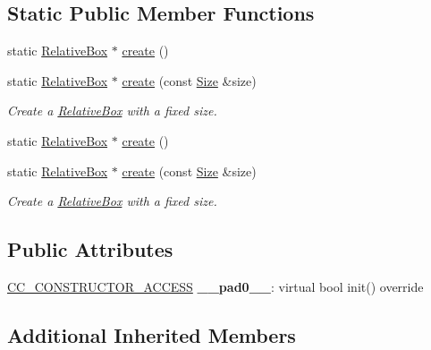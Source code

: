 \subsection*{Static Public Member Functions}
\begin{DoxyCompactItemize}
\item 
static \hyperlink{classui_1_1RelativeBox}{Relative\+Box} $\ast$ \hyperlink{classui_1_1RelativeBox_a1b24d37fcf9825a5fea2057f346f2e95}{create} ()
\item 
static \hyperlink{classui_1_1RelativeBox}{Relative\+Box} $\ast$ \hyperlink{classui_1_1RelativeBox_a2e368badd32439b98017bcd362e5c413}{create} (const \hyperlink{classSize}{Size} \&size)
\begin{DoxyCompactList}\small\item\em Create a \hyperlink{classui_1_1RelativeBox}{Relative\+Box} with a fixed size. \end{DoxyCompactList}\item 
static \hyperlink{classui_1_1RelativeBox}{Relative\+Box} $\ast$ \hyperlink{classui_1_1RelativeBox_adfbee03fc12edd6b8670bd2904531e7d}{create} ()
\item 
static \hyperlink{classui_1_1RelativeBox}{Relative\+Box} $\ast$ \hyperlink{classui_1_1RelativeBox_a2e368badd32439b98017bcd362e5c413}{create} (const \hyperlink{classSize}{Size} \&size)
\begin{DoxyCompactList}\small\item\em Create a \hyperlink{classui_1_1RelativeBox}{Relative\+Box} with a fixed size. \end{DoxyCompactList}\end{DoxyCompactItemize}
\subsection*{Public Attributes}
\begin{DoxyCompactItemize}
\item 
\mbox{\label{classui_1_1RelativeBox_ae2565362a32e7bc8e9de22177f9d8aba}} 
\hyperlink{_2cocos2d_2cocos_2base_2ccConfig_8h_a25ef1314f97c35a2ed3d029b0ead6da0}{C\+C\+\_\+\+C\+O\+N\+S\+T\+R\+U\+C\+T\+O\+R\+\_\+\+A\+C\+C\+E\+SS} {\bfseries \+\_\+\+\_\+pad0\+\_\+\+\_\+}\+: virtual bool init() override
\end{DoxyCompactItemize}
\subsection*{Additional Inherited Members}


